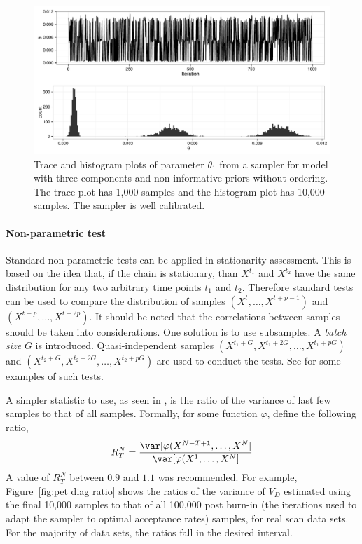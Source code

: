 \begin{figure}
  \includegraphics[width=\linewidth]{fig/PET_MH_Diag_C}
  \caption[Trace and histogram of parameters in the random walk algorithm for
  the \protect\pet compartmental model (uncalibrated)]
  {Trace and histogram plots of parameter $\theta_1$ from a \mcmc
    sampler for \pet model with three components and non-informative priors
    without ordering. The trace plot has 1,000 samples and the histogram plot
    has 10,000 samples. The sampler is well calibrated.}
  \label{fig:pet diag c}
\end{figure}

\paragraph{Non-parametric test}

Standard non-parametric tests can be applied in stationarity assessment. This
is based on the idea that, if the chain is stationary, than $X^{t_1}$ and
$X^{t_2}$ have the same distribution for any two arbitrary time points $t_1$
and $t_2$. Therefore standard tests can be used to compare the distribution of
samples $(X^t,\dots,X^{t+p-1})$ and $(X^{t+p},\dots,X^{t+2p})$. It should be
noted that the correlations between samples should be taken into
considerations. One solution is to use subsamples. A \emph{batch size} $G$ is
introduced. Quasi-independent samples
$(X^{t_1+G},X^{t_1+2G},\dots,X^{t_1+pG})$ and
$(X^{t_2+G},X^{t_2+2G},\dots,X^{t_2+pG})$ are used to conduct the tests. See
\cite[][sec.~12.2.2]{Robert:2004tn} for some examples of such tests.

A simpler statistic to use, as seen in \cite{Gelman:2011vx}, is the ratio of
the variance of last few samples to that of all samples. Formally, for some
function $\varphi$, define the following ratio,
\begin{equation}
  R_T^N = \frac{\var[\varphi(X^{N-T+1},\dots,X^{N}]}
  {\var[\varphi(X^{1},\dots,X^{N}]}
\end{equation}
A value of $R_T^N$ between $0.9$ and $1.1$ was recommended. For example,
Figure~\ref{fig:pet diag ratio} shows the ratios of the variance of $V_D$
estimated using the final 10,000 samples to that of all 100,000 post burn-in
(the iterations used to adapt the sampler to optimal acceptance rates)
samples, for real \pet scan data sets. For the majority of data sets, the
ratios fall in the desired interval.

